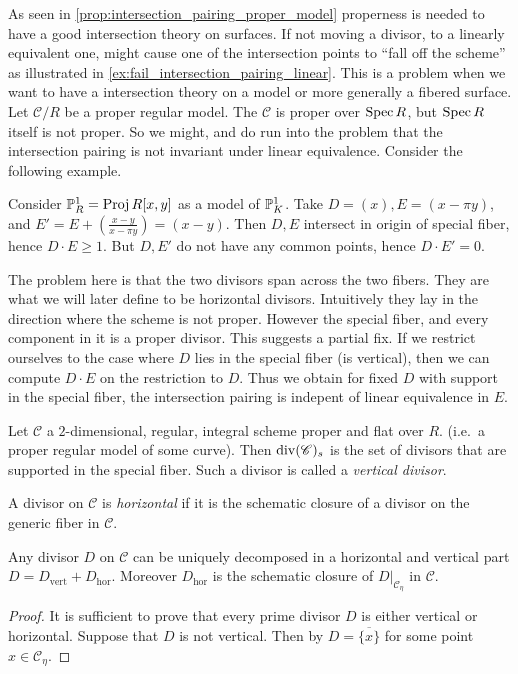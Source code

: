 
As seen in \cref{prop:intersection_pairing_proper_model} properness is needed to have a good intersection theory on surfaces. 
If not moving a divisor, to a linearly equivalent one, might cause one of the intersection points to ``fall off the scheme'' as illustrated in \cref{ex:fail_intersection_pairing_linear}.
This is a problem when we want to have a intersection theory on a model or more generally a fibered surface. 
Let $\mathscr C  / R $ be a proper regular model. 
The $\mathscr C$ is proper over $\operatorname{Spec} R$, but $\operatorname{Spec} R$ itself is not proper. 
So we might, and do run into the problem that the intersection pairing is not invariant under linear equivalence. Consider the following example.

\begin{example}\label{ex:first_model}
	Consider $\mathbb{P}^{1}_R = \operatorname{Proj} R[x, y]$ as a model of $\mathbb{P}^{1}_K$. 
	Take $D = (x), E = (x-\pi y )$, and $E' = E + (\frac{x-y}{x-\pi y})= (x - y)$.
	Then  $D, E$ intersect in origin of special fiber, hence $D\cdot E \ge 1$. 
	But $D, E'$ do not have any common points, hence $D \cdot E' = 0$. 
\end{example}

The problem here is that the two divisors span across the two fibers.
They are what we will later define to be horizontal divisors. 
Intuitively they lay in the direction where the scheme is not proper. 
However the special fiber, and every component in it is a proper divisor. 
This suggests a partial fix.
If we restrict ourselves to the case where $D$ lies in the special fiber (is vertical), then we can compute $D\cdot E$ on the restriction to $D$.  
Thus we obtain for fixed $D$ with support in the special fiber, the intersection pairing is indepent of linear equivalence in $E$. 
\begin{definition}\label{def:vertical_divisor}
	Let $\mathscr{C}$ a $2$-dimensional, regular, integral scheme proper and flat over $R$.  (i.e.\ a proper regular model of some curve). 
	Then $\operatorname{div}(\mathscr{C})_s$ is the set of divisors that are supported in the special fiber. 
	Such a divisor is called a \emph{vertical divisor}.
\end{definition}
\begin{definition}\label{def:horizontal_divisor}
	A divisor on $\mathscr{C} $ is \emph{horizontal} if it is the schematic closure of a divisor on the generic fiber in $\mathscr C$. 
\end{definition}
\begin{lemma}\label{lem:decomponsition_horizontal_vertical}
	Any divisor $D$ on $\mathscr{C}$ can be uniquely decomposed in a horizontal and vertical part $D =  D_\text{vert}  + D_\text{hor}$. 
	Moreover $D_\text{hor} $ is the schematic closure of $D|_{\mathscr C_\eta}$ in $\mathscr C$.
\end{lemma}
\begin{proof}
	It is sufficient to prove that every prime divisor $D$ is either vertical or horizontal.
	Suppose that $D$ is not vertical. 
	Then by \cite[prop. 8.3.4]{liuAlgebraicGeometryArithmetic2002} $D = \overline{\{x\} }$ for some point $x \in \mathscr{C} _\eta$.
\end{proof}

